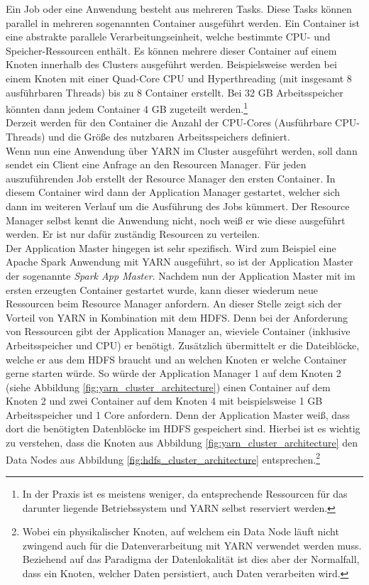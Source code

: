 \noindent
Ein Job oder eine Anwendung besteht aus mehreren Tasks. Diese Tasks können parallel in mehreren sogenannten Container ausgeführt werden. Ein Container ist eine abstrakte parallele Verarbeitungseinheit, welche bestimmte CPU- und Speicher-Ressourcen enthält. Es können mehrere dieser Container auf einem Knoten innerhalb des Clusters ausgeführt werden. Beispielsweise werden bei einem Knoten mit einer Quad-Core CPU und Hyperthreading (mit insgesamt 8 ausführbaren Threads) bis zu 8 Container erstellt. Bei 32 GB Arbeitsspeicher könnten dann jedem Container 4 GB zugeteilt werden.\footnote{In der Praxis ist es meistens weniger, da entsprechende Ressourcen für das darunter liegende Betriebssystem und YARN selbst reserviert werden.}\\
Derzeit werden für den Container die Anzahl der CPU-Cores (Ausführbare CPU-Threads) und die Größe des nutzbaren Arbeitsspeichers definiert.\cite[S. 48 ff.]{expert_hadoop_admin}\\

\noindent
Wenn nun eine Anwendung über YARN im Cluster ausgeführt werden, soll dann sendet ein Client eine Anfrage an den Resourcen Manager. 
Für jeden auszuführenden Job erstellt der Resource Manager den ersten Container. In diesem Container wird dann der Application Manager gestartet, welcher sich dann im weiteren Verlauf um die Ausführung des Jobs kümmert. Der Resource Manager selbst kennt die Anwendung nicht, noch weiß er wie diese ausgeführt werden. 
Er ist nur dafür zuständig Resourcen zu verteilen.\\ 
Der Application Master hingegen ist sehr spezifisch. Wird zum Beispiel eine Apache Spark Anwendung mit YARN ausgeführt, so ist der Application Master der sogenannte \textit{Spark App Master}. Nachdem nun der Application Master mit im ersten erzeugten Container gestartet wurde, kann dieser wiederum neue Ressourcen beim Resource Manager anfordern. An dieser Stelle zeigt sich der Vorteil von YARN in Kombination mit dem HDFS. Denn bei der Anforderung von Ressourcen gibt der Application Manager an, wieviele Container (inklusive Arbeitsspeicher und CPU) er benötigt. Zusätzlich übermittelt er die Dateiblöcke, welche er aus dem HDFS braucht und an welchen Knoten er welche Container gerne starten würde. So würde der Application Manager 1 auf dem Knoten 2 (siehe Abbildung \ref{fig:yarn_cluster_architecture}) einen Container auf dem Knoten 2 und zwei Container auf dem Knoten 4 mit beispielsweise 1 GB Arbeitsspeicher und 1 Core anfordern. Denn der Application Master weiß, dass dort die benötigten Datenblöcke im HDFS gespeichert sind. Hierbei ist es wichtig zu verstehen, dass die Knoten aus Abbildung \ref{fig:yarn_cluster_architecture} den Data Nodes aus Abbildung \ref{fig:hdfs_cluster_architecture} entsprechen.\footnote{Wobei ein physikalischer Knoten, auf welchem ein Data Node läuft nicht zwingend auch für die Datenverarbeitung mit YARN verwendet werden muss. Beziehend auf das Paradigma der Datenlokalität ist dies aber der Normalfall, dass ein Knoten, welcher Daten persistiert, auch Daten verarbeiten wird.}\\

